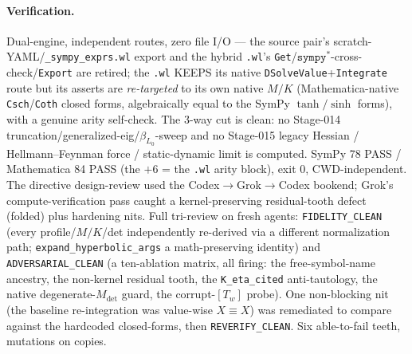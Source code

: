 \paragraph{Verification.}
Dual-engine, independent routes, zero file I/O --- the source pair's
scratch-YAML/\texttt{\_sympy\_exprs.wl} export and the hybrid \texttt{.wl}'s
\texttt{Get}/\(\texttt{sympy}^\ast\)-cross-check/\texttt{Export} are retired; the
\texttt{.wl} KEEPS its native \texttt{DSolveValue}+\texttt{Integrate} route but
its asserts are \emph{re-targeted} to its own native \(M/K\) (Mathematica-native
\texttt{Csch}/\texttt{Coth} closed forms, algebraically equal to the SymPy
\(\tanh/\sinh\) forms), with a genuine arity self-check. The 3-way cut is clean:
no Stage-014 truncation/generalized-eig/\(\beta_{L_0}\)-sweep and no Stage-015
legacy Hessian / Hellmann--Feynman force / static-dynamic limit is computed.
SymPy 78 PASS / Mathematica 84 PASS (the \(+6\) = the \texttt{.wl} arity block),
exit 0, CWD-independent. The directive design-review used the
Codex\(\to\)Grok\(\to\)Codex bookend; Grok's compute-verification pass caught a
kernel-preserving residual-tooth defect (folded) plus hardening nits. Full
tri-review on fresh agents: \texttt{FIDELITY\_CLEAN} (every profile/\(M/K\)/det
independently re-derived via a different normalization path;
\texttt{expand\_hyperbolic\_args} a math-preserving identity) and
\texttt{ADVERSARIAL\_CLEAN} (a ten-ablation matrix, all firing: the
free-symbol-name ancestry, the non-kernel residual tooth, the
\texttt{K\_eta\_cited} anti-tautology, the native degenerate-\(M_{\det}\) guard,
the corrupt-\([T_w]\) probe). One non-blocking nit (the baseline re-integration
was value-wise \(X\equiv X\)) was remediated to compare against the hardcoded
closed-forms, then \texttt{REVERIFY\_CLEAN}. Six able-to-fail teeth, mutations on
copies.
